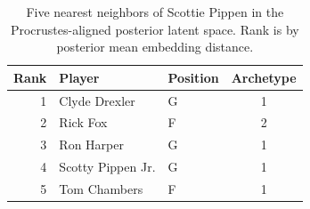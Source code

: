 \begin{table}[htbp]
  \centering\small
  \begin{tabular}{rllc}
    \toprule
    Rank & Player & Position & Archetype \\
    \midrule
    1 & Clyde Drexler & G & 1 \\
    2 & Rick Fox & F & 2 \\
    3 & Ron Harper & G & 1 \\
    4 & Scotty Pippen Jr. & G & 1 \\
    5 & Tom Chambers & F & 1 \\
    \bottomrule
  \end{tabular}
  \caption{Five nearest neighbors of Scottie Pippen in the Procrustes-aligned posterior latent space. Rank is by posterior mean embedding distance.}
  \label{tab:Scottie_Pippen_neighbors}
\end{table}

